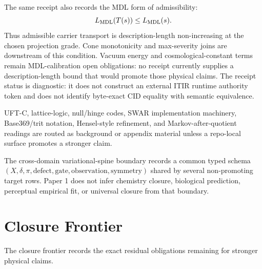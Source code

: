 \documentclass[11pt]{article}
\theoremstyle{definition}
\theoremstyle{plain}
\theoremstyle{remark}
\begin{document}
The same receipt also records the MDL form of admissibility:
\[
L_{\rm MDL}(T(s))\leq L_{\rm MDL}(s).
\]
Thus admissible carrier transport is description-length non-increasing at the
chosen projection grade. Cone monotonicity and max-severity joins are
downstream of this condition. Vacuum energy and cosmological-constant terms
remain MDL-calibration open obligations: no receipt currently supplies a
description-length bound that would promote those physical claims. The receipt
status is diagnostic: it does not construct an external ITIR runtime authority
token and does not identify byte-exact CID equality with semantic equivalence.

UFT-C, lattice-logic, null/hinge codes, SWAR implementation machinery,
Base369/trit notation, Hensel-style refinement, and Markov-after-quotient
readings are routed as background or appendix material unless a repo-local
surface promotes a stronger claim.

The cross-domain variational-spine boundary records a common typed schema
\((X,\delta,\pi,\mathrm{defect},\mathrm{gate},\mathrm{observation},
\mathrm{symmetry})\) shared by several non-promoting target rows. Paper 1 does
not infer chemistry closure, biological prediction, perceptual empirical fit,
or universal closure from that boundary.

\section{Closure Frontier}

The closure frontier records the exact residual obligations remaining for
stronger physical claims.
\end{document}
